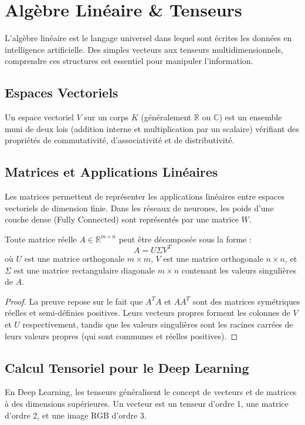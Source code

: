 \chapter{Algèbre Linéaire \& Tenseurs}

L'algèbre linéaire est le langage universel dans lequel sont écrites les données en intelligence artificielle. Des simples vecteurs aux tenseurs multidimensionnels, comprendre ces structures est essentiel pour manipuler l'information.

\section{Espaces Vectoriels}

\begin{definition}
Un espace vectoriel $V$ sur un corps $K$ (généralement $\mathbb{R}$ ou $\mathbb{C}$) est un ensemble muni de deux lois (addition interne et multiplication par un scalaire) vérifiant des propriétés de commutativité, d'associativité et de distributivité.
\end{definition}

\section{Matrices et Applications Linéaires}

Les matrices permettent de représenter les applications linéaires entre espaces vectoriels de dimension finie. Dans les réseaux de neurones, les poids d'une couche dense (Fully Connected) sont représentés par une matrice $W$.

\begin{theorem}
Toute matrice réelle $A \in \mathbb{R}^{m \times n}$ peut être décomposée sous la forme :
$$ A = U \Sigma V^T $$
où $U$ est une matrice orthogonale $m \times m$, $V$ est une matrice orthogonale $n \times n$, et $\Sigma$ est une matrice rectangulaire diagonale $m \times n$ contenant les valeurs singulières de $A$.
\end{theorem}

\begin{proof}
La preuve repose sur le fait que $A^TA$ et $AA^T$ sont des matrices symétriques réelles et semi-définies positives. Leurs vecteurs propres forment les colonnes de $V$ et $U$ respectivement, tandis que les valeurs singulières sont les racines carrées de leurs valeurs propres (qui sont communes et réelles positives).
\end{proof}

\section{Calcul Tensoriel pour le Deep Learning}

En Deep Learning, les tenseurs généralisent le concept de vecteurs et de matrices à des dimensions supérieures. Un vecteur est un tenseur d'ordre 1, une matrice d'ordre 2, et une image RGB d'ordre 3.
